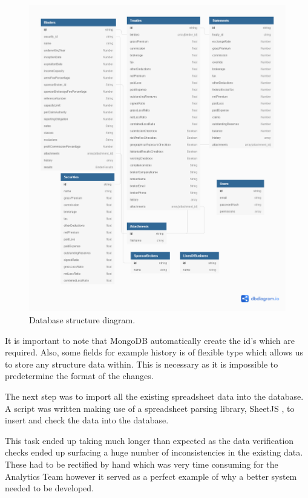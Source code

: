 \documentclass[12pt]{article}
\begin{document}
\begin{figure}
    \includegraphics[width=\linewidth]{database.png}
    \caption{Database structure diagram.}
    \label{fig:database}
\end{figure}

It is important to note that MongoDB automatically create the id's which are required. Also, some fields for example history is of flexible type which allows us to store any structure data within. This is necessary as it is impossible to predetermine the format of the changes.

The next step was to import all the existing spreadsheet data into the database. A script was written making use of a spreadsheet parsing library, SheetJS \cite{sheetjs}, to insert and check the data into the database.

This task ended up taking much longer than expected as the data verification checks ended up surfacing a huge number of inconsistencies in the existing data. These had to be rectified by hand which was very time consuming for the Analytics Team however it served as a perfect example of why a better system needed to be developed.
\end{document}
